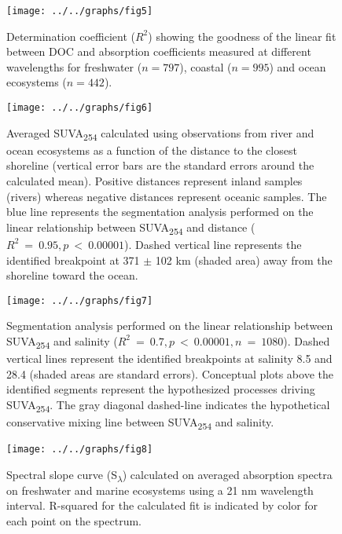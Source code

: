 \documentclass[10pt,a4paper]{scrartcl}
\begin{document}
\clearpage
\newpage

\begin{figure}[h]
	\centering
	\texttt{[image: ../../graphs/fig5]}
	\caption{Determination coefficient ($R^2$) showing the goodness of the linear fit between DOC and absorption coefficients measured at different wavelengths for freshwater ($n = 797$), coastal ($n = 995$) and ocean ecosystems ($n = 442$).}
\end{figure}

\clearpage
\newpage

\begin{figure}[h]
	\centering
	\texttt{[image: ../../graphs/fig6]}
	\caption{Averaged SUVA\textsubscript{254} calculated using observations from river and ocean ecosystems as a function of the distance to the closest shoreline (vertical error bars are the standard errors around the calculated mean). Positive distances represent inland samples (rivers) whereas negative distances represent oceanic samples. The blue line represents the segmentation analysis performed on the linear relationship between SUVA\textsubscript{254} and distance ($R^2~=~0.95, p~<~0.00001$). Dashed vertical line represents the identified breakpoint at 371 $\pm$ 102 km (shaded area) away from the shoreline toward the ocean.}

\end{figure}

\clearpage
\newpage

\begin{figure}[h]
	\centering
	\texttt{[image: ../../graphs/fig7]}
	\caption{Segmentation analysis performed on the linear relationship between SUVA\textsubscript{254} and salinity ($R^2~=~0.7, p~<~0.00001, n~=~1080$). Dashed vertical lines represent the identified breakpoints at salinity 8.5 and 28.4 (shaded areas are standard errors). Conceptual plots above the identified segments represent the hypothesized processes driving SUVA\textsubscript{254}. The gray diagonal dashed-line indicates the hypothetical conservative mixing line between SUVA\textsubscript{254} and salinity.}
\end{figure}

\clearpage
\newpage

\begin{figure}[h]
	\centering
	\texttt{[image: ../../graphs/fig8]}
	\caption{Spectral slope curve (S\textsubscript{$\lambda$}) calculated on averaged absorption spectra on freshwater and marine ecosystems using a 21 nm wavelength interval. R-squared for the calculated fit is indicated by color for each point on the spectrum.}
\end{figure}
\end{document}
